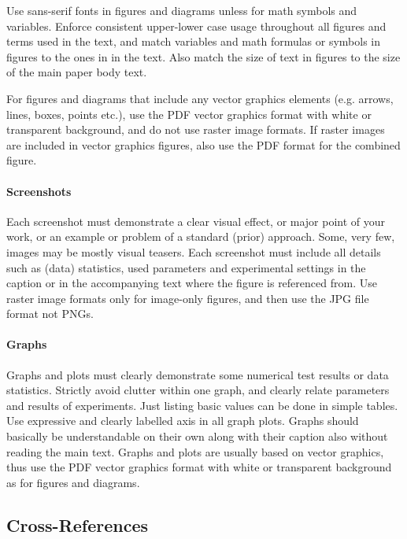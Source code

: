 \documentclass[11pt, a4paper,oneside,chapterprefix=false]{scrbook}
\begin{document}
Use sans-serif fonts in figures and diagrams unless for math symbols and variables. Enforce consistent upper-lower case usage throughout all figures and terms used in the text, and match variables and math formulas or symbols in figures to the ones in in the text. Also match the size of text in figures to the size of the main paper body text.

For figures and diagrams that include any vector graphics elements (e.g. arrows, lines, boxes, points etc.), use the PDF vector graphics format with white or transparent background, and do not use raster image formats. If raster images are included in vector graphics figures, also use the PDF format for the combined figure.

\paragraph{Screenshots}
Each screenshot must demonstrate a clear visual effect, or major point of your work, or an example or problem of a standard (prior) approach. Some, very few, images may be mostly visual teasers. Each screenshot must include all details such as (data) statistics, used parameters and experimental settings in the caption or in the accompanying text where the figure is referenced from. Use raster image formats only for image-only figures, and then use the JPG file format not PNGs.

\paragraph{Graphs}
Graphs and plots must clearly demonstrate some numerical test results or data statistics. Strictly avoid clutter within one graph, and clearly relate parameters and results of experiments. Just listing basic values can be done in simple tables.
Use expressive and clearly labelled axis in all graph plots. Graphs should basically be understandable on their own along with their caption also without reading the main text. Graphs and plots are usually based on vector graphics, thus use the PDF vector graphics format with white or transparent background as for figures and diagrams.

\subsection*{Cross-References}
\end{document}
